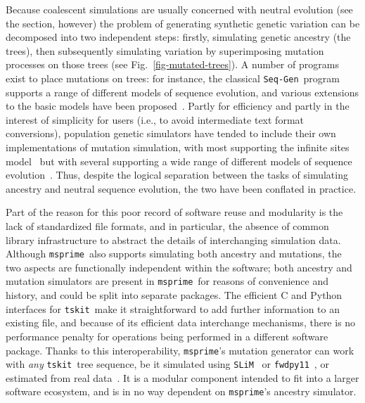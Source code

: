 \documentclass[9pt,twocolumn,twoside,lineno]{gsajnl}
\newcommand{\msprime}[0]{\texttt{msprime}}
\newcommand{\tskit}[0]{\texttt{tskit}}
\newcommand{\SLiM}[0]{\texttt{SLiM}}
\newcommand{\fwdpy}[0]{\texttt{fwdpy11}}
\newcommand{\SeqGen}[0]{\texttt{Seq-Gen}}
\begin{document}
Because coalescent simulations are usually concerned with
neutral evolution (see the  section, however)
the problem of generating synthetic genetic variation can be decomposed into
two independent steps:
firstly, simulating genetic ancestry (the trees), then subsequently simulating
variation by superimposing mutation processes on those trees
(see Fig.~\ref{fig-mutated-trees}).
A number of programs exist to place mutations on trees: for instance,
the classical \SeqGen\ program~\citep{rambaut1997seq}
supports a range of different models of sequence evolution,
and various extensions to the basic
models have been proposed~\citep[e.g.][]{cartwright2005dna,fletcher2009indelible}.
Partly for efficiency and partly in the interest of
simplicity for users (i.e., to avoid intermediate text format conversions),
population genetic simulators have tended to
include their own implementations of mutation simulation, with
most supporting the infinite sites
model~\citep[e.g.][]{hudson2002generating}
but with several supporting a wide range of different models of sequence
evolution~\citep[e.g.][]{mailund2005coasim,excoffier2011fastsimcoal,
virgoulay2021gspace}. Thus, despite the logical separation between
the tasks of simulating ancestry and neutral sequence evolution,
the two have been conflated in practice.

Part of the reason for this poor record of software reuse and modularity is the
lack of standardized file formats, and in particular, the absence of common
library infrastructure to abstract the details of interchanging simulation
data. Although \msprime\ also supports simulating both ancestry and mutations,
the two aspects are functionally independent within the software; both ancestry and mutation simulators are present in \msprime\
for reasons of convenience and history,
and could be split into separate packages.
The efficient C and Python interfaces for
\tskit\ make it straightforward to add further information to
an existing file, and because of its efficient data interchange mechanisms,
there is no performance penalty for operations being performed
in a different software package.
Thanks to this interoperability, \msprime's
mutation generator can work with \emph{any} \tskit\ tree sequence,
be it simulated using \SLiM~\citep{haller2019slim} or
\fwdpy~\citep{thornton2014cpp}, or estimated from real
data~\citep{kelleher2019inferring,speidel2019method,wohns2021unified}.
It is a modular
component intended to fit into a larger software ecosystem, and
is in no way dependent on \msprime's ancestry simulator.
\end{document}
